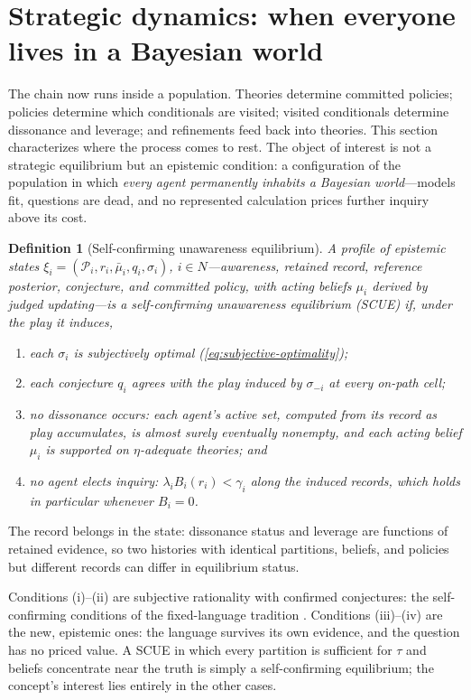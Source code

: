 \documentclass[11pt]{article}
\newtheorem{definition}[assumption]{Definition}
\theoremstyle{definition}
\begin{document}
\section{Strategic dynamics: when everyone lives in a Bayesian world}
\label{sec:dynamics}

The chain now runs inside a population.  Theories determine committed
policies; policies determine which conditionals are visited; visited
conditionals determine dissonance and leverage; and refinements feed back
into theories.  This section characterizes where the process comes to rest.
The object of interest is not a strategic equilibrium but an epistemic
condition: a configuration of the population in which \emph{every agent
permanently inhabits a Bayesian world}---models fit, questions are dead, and
no represented calculation prices further inquiry above its cost.

\begin{definition}[Self-confirming unawareness equilibrium]
\label{def:scue}
A profile of epistemic states
$\xi_i=(\mathcal P_i,r_i,\bar\mu_i,q_i,\sigma_i)$, $i\in N$---awareness,
retained record, reference posterior, conjecture, and committed policy, with
acting beliefs $\mu_i$ derived by judged updating---is a
\emph{self-confirming unawareness equilibrium} (SCUE) if, under the play it
induces,
\begin{enumerate}[label=(\roman*)]
  \item each $\sigma_i$ is subjectively optimal
  (\cref{eq:subjective-optimality});
  \item each conjecture $q_i$ agrees with the play induced by $\sigma_{-i}$
  at every on-path cell;
  \item no dissonance occurs: each agent's active set, computed from its
  record as play accumulates, is almost surely eventually nonempty, and each
  acting belief $\mu_i$ is supported on $\eta$-adequate theories; and
  \item no agent elects inquiry: $\lambda_iB_i(r_i)<\gamma_i$ along the
  induced records, which holds in particular whenever $B_i=0$.
\end{enumerate}
\end{definition}

The record belongs in the state: dissonance status and leverage are
functions of retained evidence, so two histories with identical partitions,
beliefs, and policies but different records can differ in equilibrium
status.

Conditions (i)--(ii) are subjective rationality with confirmed conjectures:
the self-confirming conditions of the fixed-language tradition
\citep{FudenbergLevine1993,KalaiLehrer1993b}.  Conditions (iii)--(iv) are the
new, epistemic ones: the language survives its own evidence, and the
question has no priced value.  A SCUE in which every partition is sufficient
for $\tau$ and beliefs concentrate near the truth is simply a
self-confirming equilibrium; the concept's interest lies entirely in the
other cases.
\end{document}
